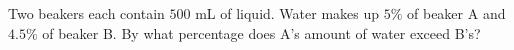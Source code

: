 Two beakers each contain $500$ mL of liquid. Water makes up $5\%$ of beaker A and $4.5\%$ of beaker B. By what percentage does A's amount of water exceed B's?
